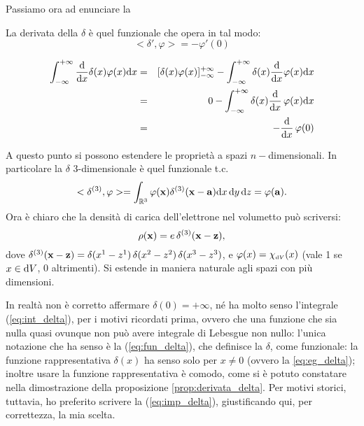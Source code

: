 Passiamo ora ad enunciare la
\begin{proposizione}
  \label{prop:derivata_delta}
  La derivata della $\delta$ \`e quel funzionale che opera in tal
  modo:
$$
<\delta', \varphi> = - \varphi'(0)
$$
\end{proposizione}
\begin{dimostrazione}
  \begin{eqnarray*}
    \int_{-\infty}^{+\infty} \frac{\mathrm{d} }{\mathrm{d} x}\delta(x) \varphi(x) \mathrm{d}
    x & = & [\delta(x)\varphi(x)]_{-\infty}^{+\infty} -
    \int_{-\infty}^{+\infty} \delta(x) \frac{\mathrm{d}}{\mathrm{d} x} \varphi(x)
    \mathrm{d} x
    \\
    & = &  0 - \int_{-\infty}^{+\infty} \delta(x) \frac{\mathrm{d}}{\mathrm{d} x}\,
    \varphi(x) \mathrm{d} x \\
    & = & - \frac{\mathrm{d}}{\mathrm{d} x} \, \varphi(0)
  \end{eqnarray*}
\end{dimostrazione}
A questo punto si possono estendere le propriet\`a a spazi
$n-$dimensionali. In particolare la $\delta$ 3-dimensionale \`e quel
funzionale t.c.
$$
<\delta^{(3)},\varphi> = \int_{\mathbb{R}^3} \varphi(\mathbf{x})
\delta^{(3)} (\mathbf{x-a}) \mathrm{d} x \, \mathrm{d} y \, \mathrm{d} z = \varphi(\mathbf{a}).
$$
Ora \`e chiaro che la densit\`a di carica dell'elettrone nel volumetto
pu\`o scriversi:
$$
\rho(\mathbf{x}) = e \, \delta^{(3)}(\mathbf{x-z}),
$$
dove $\delta^{(3)}(\mathbf{x-z}) = \delta(x^1-z^1) \, \delta(x^2-z^2) \,
\delta(x^3-z^3)$, e $\varphi (x) = \chi_{\scriptscriptstyle \mathrm{d} V}(x)$
(vale 1 se $x \in \mathrm{d} V$, 0 altrimenti). Si estende in maniera
naturale agli spazi con pi\`u dimensioni.
\begin{observazione}
  In realt\`a non \`e corretto affermare $\delta(0)= + \infty$, n\'e
  ha molto senso l'integrale (\ref{eq:int_delta}), per i motivi
  ricordati prima, ovvero che una funzione che sia nulla quasi ovunque
  non pu\`o avere integrale di Lebesgue non nullo: l'unica notazione
  che ha senso \`e la (\ref{eq:fun_delta}), che definisce la $\delta$,
  come funzionale: la funzione rappresentativa $\delta(x)$ ha senso
  solo per $x \neq 0$ (ovvero la \ref{eq:eg_delta}); inoltre usare la
  funzione rappresentativa \`e comodo, come si \`e potuto constatare
  nella dimostrazione della proposizione
  \ref{prop:derivata_delta}. Per motivi storici, tuttavia, ho
  preferito scrivere la (\ref{eq:imp_delta}), giustificando qui, per
  correttezza, la mia scelta.
\end{observazione}
